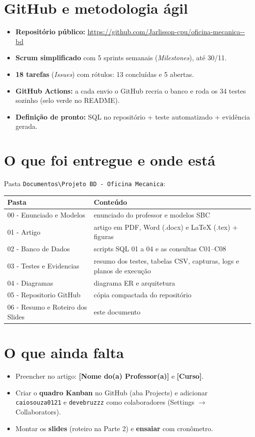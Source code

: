 \documentclass[a4paper,11pt]{article}
\newcommand{\cod}[1]{\texttt{\small #1}}
\begin{document}
\section{GitHub e metodologia ágil}
\begin{itemize}
  \item \textbf{Repositório público:} \url{https://github.com/Jarlisson-cpu/oficina-mecanica--bd}
  \item \textbf{Scrum simplificado} com 5 sprints semanais (\emph{Milestones}), até 30/11.
  \item \textbf{18 tarefas} (\emph{Issues}) com rótulos: 13 concluídas e 5 abertas.
  \item \textbf{GitHub Actions:} a cada envio o GitHub recria o banco e roda os 34 testes
  sozinho (selo verde no README).
  \item \textbf{Definição de pronto:} SQL no repositório + teste automatizado + evidência gerada.
\end{itemize}

\section{O que foi entregue e onde está}
Pasta \cod{Documentos\textbackslash Projeto BD - Oficina Mecanica}:
\begin{longtable}{p{5.2cm}p{9.8cm}}
\hline
\textbf{Pasta} & \textbf{Conteúdo} \\ \hline
00 - Enunciado e Modelos & enunciado do professor e modelos SBC \\
01 - Artigo & artigo em PDF, Word (.docx) e LaTeX (.tex) + figuras \\
02 - Banco de Dados & scripts SQL 01 a 04 e as consultas C01--C08 \\
03 - Testes e Evidencias & resumo dos testes, tabelas CSV, capturas, logs e planos de execução \\
04 - Diagramas & diagrama ER e arquitetura \\
05 - Repositorio GitHub & cópia compactada do repositório \\
06 - Resumo e Roteiro dos Slides & este documento \\ \hline
\end{longtable}

\section{O que ainda falta}
\begin{itemize}
  \item Preencher no artigo: \textbf{[Nome do(a) Professor(a)]} e \textbf{[Curso]}.
  \item Criar o \textbf{quadro Kanban} no GitHub (aba Projects) e adicionar
  \cod{caiosouza0121} e \cod{devebruzzz} como colaboradores (Settings $\rightarrow$ Collaborators).
  \item Montar os \textbf{slides} (roteiro na Parte 2) e \textbf{ensaiar} com cronômetro.
\end{itemize}
\end{document}
